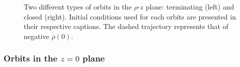\begin{figure}[!htbp]
    \centering
    \caption{Two different types of orbits in the $\rho$-$z$ plane: terminating (left) and closed (right). Initial conditions used for each orbits are presented in their respective captions. The dashed trajectory represents that of negative $\dot{\overline{\rho}}(0)$.}
    \label{ch:penrose_binaries/fig:rho_z_orbits}
\end{figure}

\subsubsection{Orbits in the $z=0$ plane}

